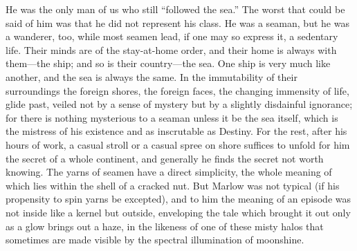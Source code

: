 \documentclass[12pt]{report}
\begin{document}
He was the only man of us who still ``followed the sea.'' The worst that
could be said of him was that he did not represent his class. He was a
seaman, but he was a wanderer, too, while most seamen lead, if one may
so express it, a sedentary life. Their minds are of the stay-at-home
order, and their home is always with them---the ship; and so is their
country---the sea. One ship is very much like another, and the sea is
always the same. In the immutability of their surroundings the foreign
shores, the foreign faces, the changing immensity of life, glide past,
veiled not by a sense of mystery but by a slightly disdainful ignorance;
for there is nothing mysterious to a seaman unless it be the sea itself,
which is the mistress of his existence and as inscrutable as Destiny.
For the rest, after his hours of work, a casual stroll or a casual spree
on shore suffices to unfold for him the secret of a whole continent, and
generally he finds the secret not worth knowing. The yarns of seamen
have a direct simplicity, the whole meaning of which lies within the
shell of a cracked nut. But Marlow was not typical (if his propensity to
spin yarns be excepted), and to him the meaning of an episode was not
inside like a kernel but outside, enveloping the tale which brought it
out only as a glow brings out a haze, in the likeness of one of these
misty halos that sometimes are made visible by the spectral illumination
of moonshine.
\end{document}

